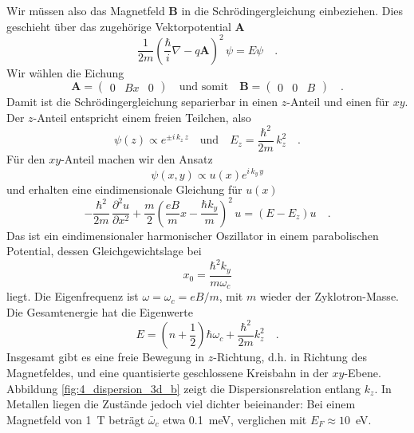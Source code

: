Wir müssen also das Magnetfeld $\mathbf{B}$ in die Schrödingergleichung einbeziehen. Dies geschieht über das zugehörige Vektorpotential $\mathbf{A}$
\begin{equation}
   \frac{1}{2m} \left( \frac{\hbar}{i} \nabla - q \mathbf{A}  \right)^2 \, \psi = E \psi \quad .
\end{equation}
Wir wählen die Eichung
\begin{equation}
   \mathbf{A} = \begin{pmatrix}
      0 & B x & 0
   \end{pmatrix}
   \quad \text{und somit} \quad
   \mathbf{B} = \begin{pmatrix}
      0 & 0 & B
   \end{pmatrix} \quad .
\end{equation}
Damit ist die Schrödingergleichung separierbar in einen $z$-Anteil und einen für $xy$. Der $z$-Anteil entspricht einem freien Teilchen, also 
\begin{equation}
    \psi(z) \propto e^{ \pm i \, k_z \, z}    \quad \text{und} \quad
    E_z = \frac{\hbar^2}{2m} \, k_z^2 \quad .
\end{equation}
Für den $xy$-Anteil machen wir den Ansatz
\begin{equation}
   \psi(x,y) \propto u(x) e^{i \, k_y \, y}
\end{equation}
und erhalten eine eindimensionale Gleichung für $u(x)$
\begin{equation}
   - \frac{\hbar^2}{2m} \, \frac{\partial^2 u }{\partial x^2} + 
   \frac{m}{2} \left(
 \frac{eB}{m} x - \frac{\hbar k_y}{m}
   \right)^2 \, u = 
   (E - E_z) u \quad .
\end{equation}
Das ist ein eindimensionaler harmonischer Oszillator in einem parabolischen Potential,  dessen Gleichgewichtslage bei 
\begin{equation}
   x_0 = \frac{\hbar^2 k_y}{m \omega_c}
\end{equation}
liegt. Die Eigenfrequenz ist $\omega = \omega_c = e B / m$, mit $m$ wieder der Zyklotron-Masse. 
Die Gesamtenergie hat die Eigenwerte
\begin{equation}
   E = \left( n + \frac{1}{2} \right) \hbar \omega_c + \frac{\hbar^2}{2m} k_z^2 \quad .
\end{equation}
Insgesamt gibt es eine freie Bewegung in $z$-Richtung, d.h. in Richtung des Magnetfeldes, und eine quantisierte geschlossene Kreisbahn in der $xy$-Ebene. Abbildung \ref{fig:4_dispersion_3d_b} zeigt die Dispersionsrelation entlang $k_z$. In Metallen liegen die Zustände jedoch viel dichter beieinander: Bei einem Magnetfeld von 1~T beträgt $\bar \omega_c$ etwa 0.1~meV, verglichen mit $E_F \approx 10$~eV.

